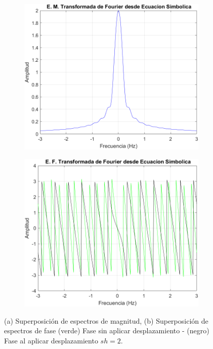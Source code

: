 \documentclass[11pt,letterpaper,twocolumn]{article}
\begin{document}
        \begin{figure}[H]
            \centering 
            \begin{subfigure}[h]{0.49\linewidth}
                \includegraphics[width=\linewidth]{img/Proptiempomagnitud.png}
                \label{P41}
                \caption{}
            \end{subfigure}
            \begin{subfigure}[h]{0.49\linewidth}
                \includegraphics[width=\linewidth]{img/Proptiempofase.png}
                \label{P42}
                \caption{}
            \end{subfigure}
            \caption{(a) Superposición de espectros de magnitud, (b) Superposición de espectros de fase (verde) Fase sin aplicar desplazamiento - (negro) Fase al aplicar desplazamiento $sh=2$.}
            \label{P4}
        \end{figure}
        \vspace{-5mm} 
        
\end{document}
